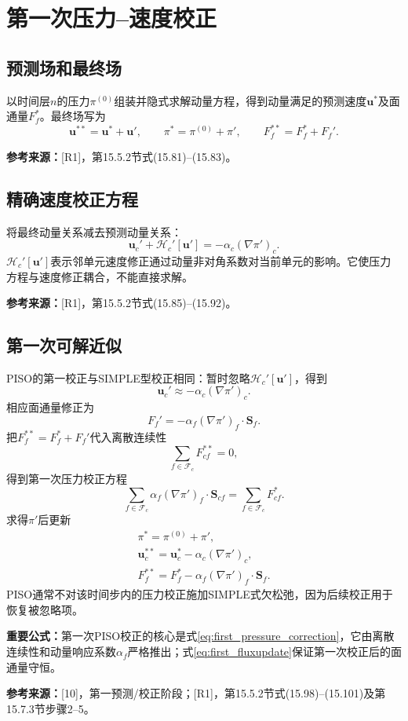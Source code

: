 \documentclass[UTF8,12pt,a4paper]{ctexart}
\numberwithin{equation}{section}
\newcommand{\Issa}{\textnormal{[10]}}
\newcommand{\Rone}{\textnormal{[R1]}}
\newcommand{\source}[1]{\par\smallskip\noindent\colorbox{sourcebg}{%
  \parbox{0.955\linewidth}{\footnotesize\color{sourcegray}\textbf{参考来源：}#1}}\par\smallskip}
\newcommand{\keytitle}[1]{\par\smallskip\noindent\colorbox{keybg}{%
  \parbox{0.965\linewidth}{\color{keyblue}\textbf{重要公式：}#1}}\par\smallskip}
\begin{document}
\section{第一次压力--速度校正}
\subsection{预测场和最终场}
以时间层$n$的压力$\pi^{(0)}$组装并隐式求解动量方程，得到动量满足的预测速度$\bm u^*$及面通量$F_f^*$。最终场写为
\begin{equation}
  \bm u^{**}=\bm u^*+\bm u',\qquad
  \pi^*=\pi^{(0)}+\pi',\qquad
  F_f^{**}=F_f^*+F_f'.
  \label{eq:first_corrections}
\end{equation}
\source{\Rone，第15.5.2节式(15.81)--(15.83)。}

\subsection{精确速度校正方程}
将最终动量关系减去预测动量关系：
\begin{equation}
  \boxed{\bm u_c'+\mathcal H_c'[\bm u']
  =-\alpha_c(\nabla\pi')_c.}
  \label{eq:exact_velocity_correction}
\end{equation}
$\mathcal H_c'[\bm u']$表示邻单元速度修正通过动量非对角系数对当前单元的影响。它使压力方程与速度修正耦合，不能直接求解。
\source{\Rone，第15.5.2节式(15.85)--(15.92)。}

\subsection{第一次可解近似}
PISO的第一校正与SIMPLE型校正相同：暂时忽略$\mathcal H_c'[\bm u']$，得到
\begin{equation}
  \boxed{\bm u_c'\approx-\alpha_c(\nabla\pi')_c.}
  \label{eq:first_uprime}
\end{equation}
相应面通量修正为
\begin{equation}
  \boxed{F_f'=-\alpha_f(\nabla\pi')_f\cdot\bm S_f.}
  \label{eq:first_fluxprime}
\end{equation}
把$F_f^{**}=F_f^*+F_f'$代入离散连续性
\[
  \sum_{f\in\mathcal F_c}F_{cf}^{**}=0,
\]
得到第一次压力校正方程
\begin{equation}
  \boxed{\sum_{f\in\mathcal F_c}
  \alpha_f(\nabla\pi')_f\cdot\bm S_{cf}
  =\sum_{f\in\mathcal F_c}F_{cf}^*.}
  \label{eq:first_pressure_correction}
\end{equation}
求得$\pi'$后更新
\begin{align}
  \boxed{\pi^*=\pi^{(0)}+\pi',}
  \label{eq:first_pupdate}\\
  \boxed{\bm u_c^{**}=\bm u_c^*
  -\alpha_c(\nabla\pi')_c,}
  \label{eq:first_uupdate}\\
  \boxed{F_f^{**}=F_f^*
  -\alpha_f(\nabla\pi')_f\cdot\bm S_f.}
  \label{eq:first_fluxupdate}
\end{align}
PISO通常不对该时间步内的压力校正施加SIMPLE式欠松弛，因为后续校正用于恢复被忽略项。
\keytitle{第一次PISO校正的核心是式\eqref{eq:first_pressure_correction}，它由离散连续性和动量响应系数$\alpha_f$严格推出；式\eqref{eq:first_fluxupdate}保证第一次校正后的面通量守恒。}
\source{\Issa，第一预测/校正阶段；\Rone，第15.5.2节式(15.98)--(15.101)及第15.7.3节步骤2--5。}
\end{document}
